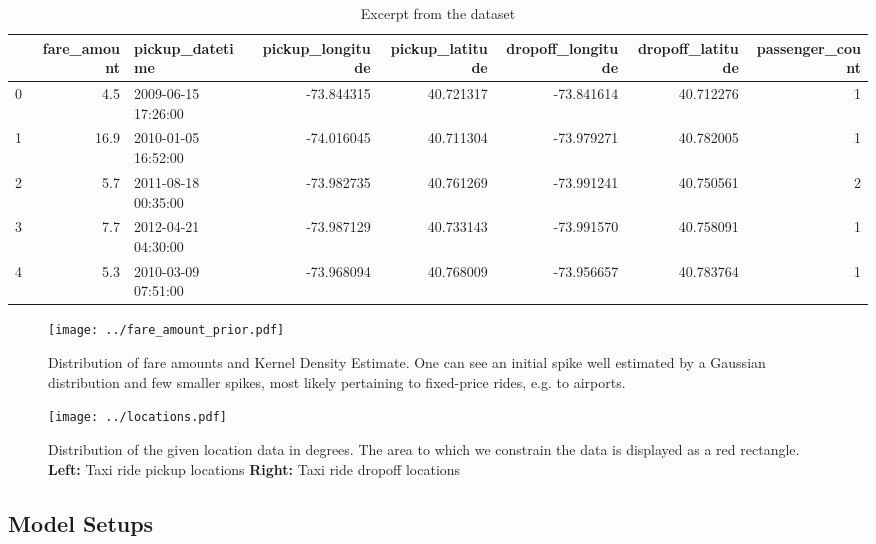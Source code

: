 \begin{table}[h]
\caption{Excerpt from the dataset}
\begin{adjustbox}{width=\textwidth}
\begin{tabular}{lrlrrrrr}
\toprule
{} &  fare\_amount &           pickup\_datetime &  pickup\_longitude &  pickup\_latitude &  dropoff\_longitude &  dropoff\_latitude &  passenger\_count \\
\midrule
0 &          4.5 & 2009-06-15 17:26:00 &        -73.844315 &        40.721317 &         -73.841614 &         40.712276 &                1 \\
1 &         16.9 & 2010-01-05 16:52:00 &        -74.016045 &        40.711304 &         -73.979271 &         40.782005 &                1 \\
2 &          5.7 & 2011-08-18 00:35:00 &        -73.982735 &        40.761269 &         -73.991241 &         40.750561 &                2 \\
3 &          7.7 & 2012-04-21 04:30:00 &        -73.987129 &        40.733143 &         -73.991570 &         40.758091 &                1 \\
4 &          5.3 & 2010-03-09 07:51:00 &        -73.968094 &        40.768009 &         -73.956657 &         40.783764 &                1 \\
\bottomrule
\end{tabular}
\end{adjustbox}
\label{tab:dataset}
\end{table}

\begin{figure}[htb!]
    \centering
    \texttt{[image: ../fare\_amount\_prior.pdf]}
    \caption{Distribution of fare amounts and Kernel Density Estimate. One can
    see an initial spike well estimated by a Gaussian distribution and few
smaller spikes, most likely pertaining to fixed-price rides, e.g. to airports.}
    \label{fig:fare_amount_prior}
\end{figure}

\begin{figure}[htb!]
    \centering
    \texttt{[image: ../locations.pdf]}
    \caption{Distribution of the given location data in degrees. The area to
    which we constrain the data is displayed as a red rectangle. \textbf{Left:}
Taxi ride pickup locations \textbf{Right:} Taxi ride dropoff locations}
    \label{fig:map}
\end{figure}

\subsection{Model Setups}%
\label{sub:model_setups}

